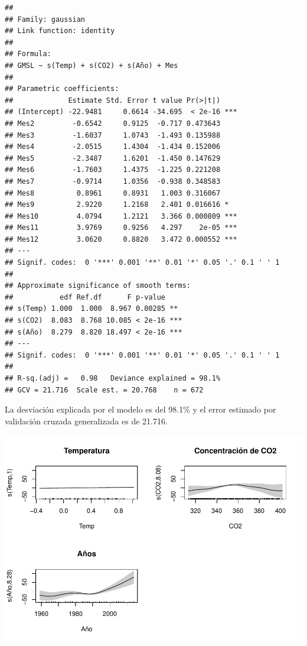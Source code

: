 \documentclass[12pt,a4paper,]{book}
\numberwithin{dummy}{section}
\theoremstyle{ocrenumbox}
\theoremstyle{blacknumex}
\theoremstyle{blacknumbox}
\theoremstyle{ocrenum}
\theoremstyle{ocrenum}
\begin{document}
\begin{verbatim}
## 
## Family: gaussian 
## Link function: identity 
## 
## Formula:
## GMSL ~ s(Temp) + s(CO2) + s(Año) + Mes
## 
## Parametric coefficients:
##             Estimate Std. Error t value Pr(>|t|)    
## (Intercept) -22.9481     0.6614 -34.695  < 2e-16 ***
## Mes2         -0.6542     0.9125  -0.717 0.473643    
## Mes3         -1.6037     1.0743  -1.493 0.135988    
## Mes4         -2.0515     1.4304  -1.434 0.152006    
## Mes5         -2.3487     1.6201  -1.450 0.147629    
## Mes6         -1.7603     1.4375  -1.225 0.221208    
## Mes7         -0.9714     1.0356  -0.938 0.348583    
## Mes8          0.8961     0.8931   1.003 0.316067    
## Mes9          2.9220     1.2168   2.401 0.016616 *  
## Mes10         4.0794     1.2121   3.366 0.000809 ***
## Mes11         3.9769     0.9256   4.297    2e-05 ***
## Mes12         3.0620     0.8820   3.472 0.000552 ***
## ---
## Signif. codes:  0 '***' 0.001 '**' 0.01 '*' 0.05 '.' 0.1 ' ' 1
## 
## Approximate significance of smooth terms:
##           edf Ref.df      F p-value    
## s(Temp) 1.000  1.000  8.967 0.00285 ** 
## s(CO2)  8.083  8.768 10.085 < 2e-16 ***
## s(Año)  8.279  8.820 18.497 < 2e-16 ***
## ---
## Signif. codes:  0 '***' 0.001 '**' 0.01 '*' 0.05 '.' 0.1 ' ' 1
## 
## R-sq.(adj) =   0.98   Deviance explained = 98.1%
## GCV = 21.716  Scale est. = 20.768    n = 672
\end{verbatim}

La desviación explicada por el modelo es del 98.1\% y el error estimado
por validación cruzada generalizada es de 21.716.

\begin{center}\includegraphics[width=0.95\linewidth]{figurasR/unnamed-chunk-38-1} \end{center}
\end{document}
